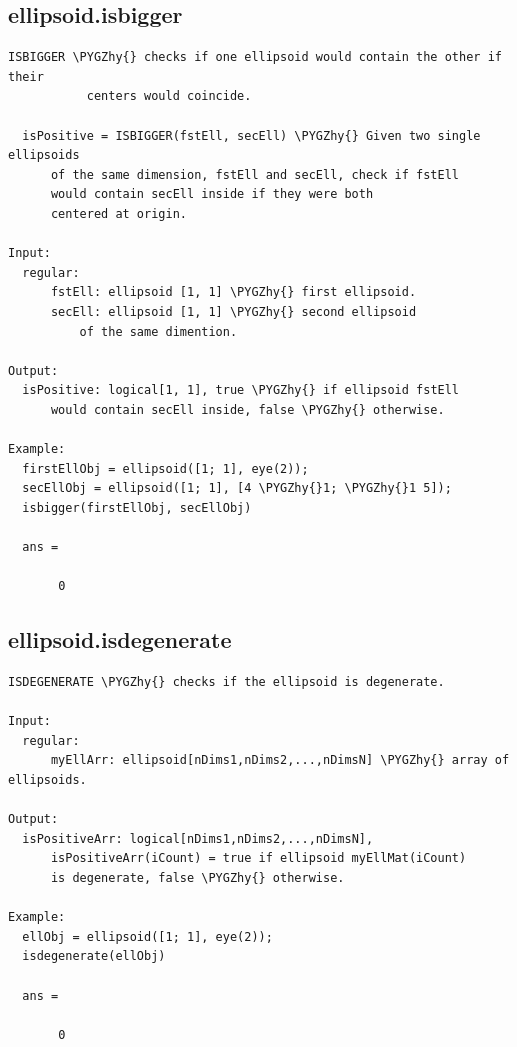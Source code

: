 \documentclass[letterpaper,10pt,english]{sphinxmanual}
\def\PYGZhy{\char`\-}
\begin{document}
\subsection{ellipsoid.isbigger}
\label{chap_functions:ellipsoid-isbigger}
\begin{Verbatim}[commandchars=\\\{\}]
ISBIGGER \PYGZhy{} checks if one ellipsoid would contain the other if their
           centers would coincide.

  isPositive = ISBIGGER(fstEll, secEll) \PYGZhy{} Given two single ellipsoids
      of the same dimension, fstEll and secEll, check if fstEll
      would contain secEll inside if they were both
      centered at origin.

Input:
  regular:
      fstEll: ellipsoid [1, 1] \PYGZhy{} first ellipsoid.
      secEll: ellipsoid [1, 1] \PYGZhy{} second ellipsoid
          of the same dimention.

Output:
  isPositive: logical[1, 1], true \PYGZhy{} if ellipsoid fstEll
      would contain secEll inside, false \PYGZhy{} otherwise.

Example:
  firstEllObj = ellipsoid([1; 1], eye(2));
  secEllObj = ellipsoid([1; 1], [4 \PYGZhy{}1; \PYGZhy{}1 5]);
  isbigger(firstEllObj, secEllObj)

  ans =

       0
\end{Verbatim}


\subsection{ellipsoid.isdegenerate}
\label{chap_functions:ellipsoid-isdegenerate}
\begin{Verbatim}[commandchars=\\\{\}]
ISDEGENERATE \PYGZhy{} checks if the ellipsoid is degenerate.

Input:
  regular:
      myEllArr: ellipsoid[nDims1,nDims2,...,nDimsN] \PYGZhy{} array of ellipsoids.

Output:
  isPositiveArr: logical[nDims1,nDims2,...,nDimsN],
      isPositiveArr(iCount) = true if ellipsoid myEllMat(iCount)
      is degenerate, false \PYGZhy{} otherwise.

Example:
  ellObj = ellipsoid([1; 1], eye(2));
  isdegenerate(ellObj)

  ans =

       0
\end{Verbatim}
\end{document}
